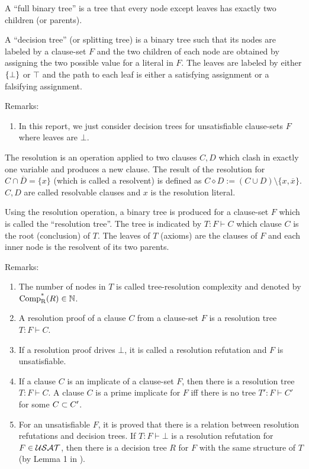 \documentclass{report}
\begin{document}
A ``full binary tree'' is a tree that every node except leaves has exactly two children (or parents). 
\begin{defi}\label{def:decs-tree}
A ``decision tree'' (or splitting tree) is a binary tree such that its nodes are labeled by a clause-set $F$ and the two children of each node are obtained by assigning the two possible value for a literal in $F$. The leaves are labeled by either $\{ \bot \}$ or $\top$ and the path to each leaf is either a satisfying assignment or a falsifying assignment.
\end{defi}
Remarks:
  \begin{enumerate}
  \item  In this report, we just consider decision trees for unsatisfiable clause-sets $F$ where leaves are $\bot$.
  \end{enumerate}

\begin{defi}\label{def:resolution}
The resolution is an operation applied to two clauses $C,D$ which clash in exactly one variable and produces a new clause. The result of the resolution for $C \cap \overline D = \{ x \}$ (which is called a resolvent) is defined as $C \diamond D := (C \cup D) \setminus \{x, \overline x\} $. $C,D$ are called resolvable clauses and $x$ is the resolution literal. 
\end{defi}
\begin{defi}\label{def:resolution-tree}
Using the resolution operation, a binary tree is produced for a clause-set $F$ which is called the ``resolution tree''. The tree is indicated by $T : F \vdash C$ which clause $C$ is the root (conclusion) of $T$. The leaves of $T$ (axioms) are the clauses of $F$ and each inner node is the resolvent of its two parents. 
\end{defi}
Remarks:
  \begin{enumerate}
  \item  The number of nodes in $T$ is called tree-resolution complexity and denoted by $\operatorname{\operatorname{Comp}_{R}^*}(R) \in \mathbb{N}$.
  \item  A resolution proof of a clause $C$ from a clause-set $F$ is a resolution tree $T : F \vdash C$.
  \item  If a resolution proof drives $\bot$, it is called a resolution refutation and $F$ is unsatisfiable.
  \item If a clause $C$ is an implicate of a clause-set $F$, then there is a resolution tree $T : F \vdash C$. A clause $C$ is a prime implicate for $F$ iff there is no tree $T': F \vdash C'$ for some $C \subset C'$.
  \item For an unsatisfiable $F$, it is proved that there is a relation between resolution refutations and decision trees. If $T : F \vdash \bot$ is a resolution refutation for $F \in \mathcal{USAT}$, then there is a decision tree $R$ for $F$ with the same structure of $T$ (by Lemma 1 in \cite{h30}).
  \end{enumerate}
\end{document}
